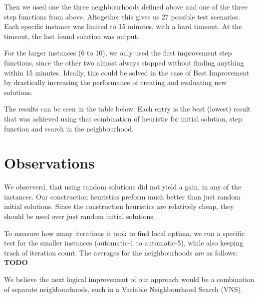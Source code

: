 \documentclass [11pt]{article}
\begin{document}
Then we used one the three neighbourhoods defined above and one of the three step functions from above. Altogether this gives us 27 possible test scenarios.  Each specific instance was limited to 15 minutes, with a hard timeout. At the timeout, the last found solution was output. 

For the larger instances (6 to 10), we only used the first improvement step functions, since the other two almost always stopped without finding anything within 15 minutes. Ideally, this could be solved in the case of Best Improvement by drastically increasing the performance of creating and evaluating new solutions. 

The results can be seen in the table below. Each entry is the best (lowest) result that was achieved using that combination of heuristic for initial solution, step function and search in the neighbourhood. 

\section{Observations}
We observerd, that using random solutions did not yield a gain, in any of the instances. Our construction heuristics preform much better than just random initial solutions. Since the construction heuristics are relatively cheap, they should be used over just random initial solutions.

To measure how many iterations it took to find local optima, we run a specific test for the smaller instances (automatic-1 to automatic-5), while also keeping track of iteration count. The averages for the neighbourhoods are as follows:  \textbf{TODO}

We believe the next logical improvement of our approach would be a combination of separate neighbourhoods, such in a Variable Neighbourhood Search (VNS). 
\end{document}
